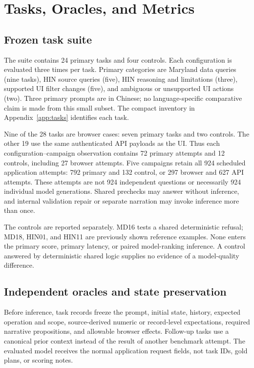 \documentclass[10pt,twocolumn,letterpaper]{article}
\begin{document}
\section{Tasks, Oracles, and Metrics}
\subsection{Frozen task suite}
The suite contains 24 primary tasks and four controls. Each configuration is evaluated three times per task. Primary categories are Maryland data queries (nine tasks), HIN source queries (five), HIN reasoning and limitations (three), supported UI filter changes (five), and ambiguous or unsupported UI actions (two). Three primary prompts are in Chinese; no language-specific comparative claim is made from this small subset. The compact inventory in Appendix~\ref{app:tasks} identifies each task.

Nine of the 28 tasks are browser cases: seven primary tasks and two controls. The other 19 use the same authenticated API payloads as the UI. Thus each configuration--campaign observation contains 72 primary attempts and 12 controls, including 27 browser attempts. Five campaigns retain all 924 scheduled application attempts: 792 primary and 132 control, or 297 browser and 627 API attempts. These attempts are not 924 independent questions or necessarily 924 individual model generations. Shared prechecks may answer without inference, and internal validation repair or separate narration may invoke inference more than once.

The controls are reported separately. MD16 tests a shared deterministic refusal; MD18, HIN01, and HIN11 are previously shown reference examples. None enters the primary score, primary latency, or paired model-ranking inference. A control answered by deterministic shared logic supplies no evidence of a model-quality difference.

\subsection{Independent oracles and state preservation}
Before inference, task records freeze the prompt, initial state, history, expected operation and scope, source-derived numeric or record-level expectations, required narrative propositions, and allowable browser effects. Follow-up tasks use a canonical prior context instead of the result of another benchmark attempt. The evaluated model receives the normal application request fields, not task IDs, gold plans, or scoring notes.
\end{document}
